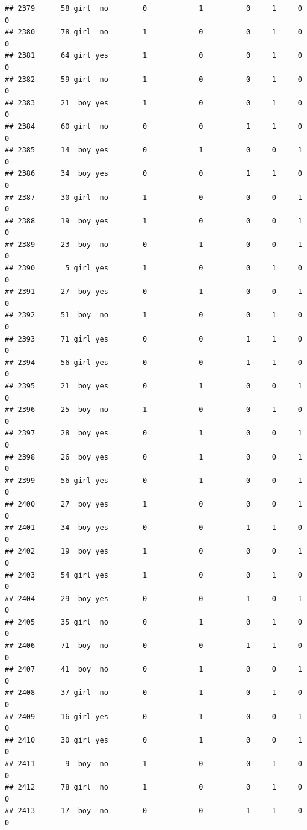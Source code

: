 \documentclass[man]{apa6}
\begin{document}
\begin{verbatim}
## 2379      58 girl  no        0            1          0     1     0     0
## 2380      78 girl  no        1            0          0     1     0     0
## 2381      64 girl yes        1            0          0     1     0     0
## 2382      59 girl  no        1            0          0     1     0     0
## 2383      21  boy yes        1            0          0     1     0     0
## 2384      60 girl  no        0            0          1     1     0     0
## 2385      14  boy yes        0            1          0     0     1     0
## 2386      34  boy yes        0            0          1     1     0     0
## 2387      30 girl  no        1            0          0     0     1     0
## 2388      19  boy yes        1            0          0     0     1     0
## 2389      23  boy  no        0            1          0     0     1     0
## 2390       5 girl yes        1            0          0     1     0     0
## 2391      27  boy yes        0            1          0     0     1     0
## 2392      51  boy  no        1            0          0     1     0     0
## 2393      71 girl yes        0            0          1     1     0     0
## 2394      56 girl yes        0            0          1     1     0     0
## 2395      21  boy yes        0            1          0     0     1     0
## 2396      25  boy  no        1            0          0     1     0     0
## 2397      28  boy yes        0            1          0     0     1     0
## 2398      26  boy yes        0            1          0     0     1     0
## 2399      56 girl yes        0            1          0     0     1     0
## 2400      27  boy yes        1            0          0     0     1     0
## 2401      34  boy yes        0            0          1     1     0     0
## 2402      19  boy yes        1            0          0     0     1     0
## 2403      54 girl yes        1            0          0     1     0     0
## 2404      29  boy yes        0            0          1     0     1     0
## 2405      35 girl  no        0            1          0     1     0     0
## 2406      71  boy  no        0            0          1     1     0     0
## 2407      41  boy  no        0            1          0     0     1     0
## 2408      37 girl  no        0            1          0     1     0     0
## 2409      16 girl yes        0            1          0     0     1     0
## 2410      30 girl yes        0            1          0     0     1     0
## 2411       9  boy  no        1            0          0     1     0     0
## 2412      78 girl  no        1            0          0     1     0     0
## 2413      17  boy  no        0            0          1     1     0     0

\end{verbatim}
\end{document}

